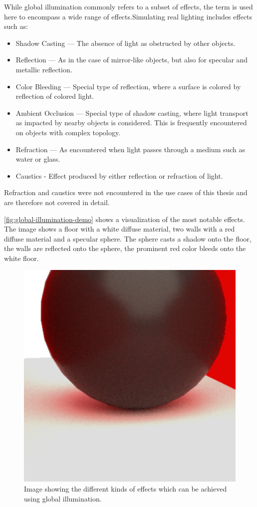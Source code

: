 While global illumination commonly refers to a subset of effects, the term is used here to encompass a wide range of effects.Simulating real lighting includes effects such as:

\begin{itemize}
  \item{Shadow Casting} — The absence of light as obstructed by other objects.
  \item{Reflection} — As in the case of mirror-like objects, but also for specular and metallic reflection.
  \item{Color Bleeding} — Special type of reflection, where a surface is colored by reflection of colored light.
  \item{Ambient Occlusion} — Special type of shadow casting, where light transport as impacted by nearby objects is considered. This is frequently encountered on objects with complex topology.
  \item{Refraction} — As encountered when light passes through a medium such as water or glass.
  \item{Caustics} - Effect produced by either reflection or refraction of light.
\end{itemize}

Refraction and caustics were not encountered in the use cases of this thesis and are therefore not covered in detail.

\autoref{fig:global-illumination-demo} shows a visualization of the most notable effects. The image shows a floor with a white diffuse material, two walls with a red diffuse material and a specular sphere. The sphere casts a shadow onto the floor, the walls are reflected onto the sphere, the prominent red color bleeds onto the white floor.

\begin{figure}[H]
  \centering
  \includegraphics[width=0.3\columnwidth]{resources/global-illumination-demonstration.png}
  \caption{Image showing the different kinds of effects which can be achieved using global illumination.}
  \label{fig:global-illumination-demo}
\end{figure}

